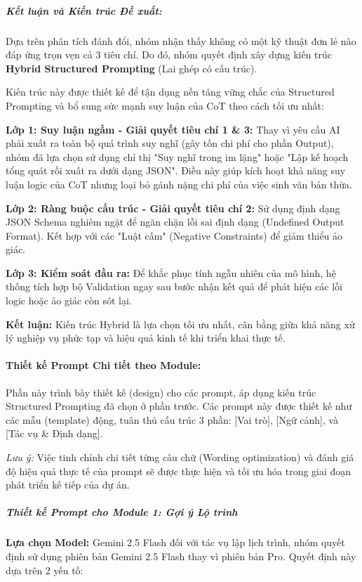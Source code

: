 \subparagraph{Kết luận và Kiến trúc Đề xuất:}

Dựa trên phân tích đánh đổi, nhóm nhận thấy không có một kỹ thuật đơn lẻ nào đáp ứng trọn vẹn cả 3 tiêu chí. Do đó, nhóm quyết định xây dựng kiến trúc \textbf{Hybrid Structured Prompting} (Lai ghép có cấu trúc).

Kiến trúc này được thiết kế để tận dụng nền tảng vững chắc của Structured Prompting và bổ sung sức mạnh suy luận của CoT theo cách tối ưu nhất:

\textbf{Lớp 1: Suy luận ngầm - Giải quyết tiêu chí 1 \& 3:} Thay vì yêu cầu AI phải xuất ra toàn bộ quá trình suy nghĩ (gây tốn chi phí cho phần Output), nhóm đã lựa chọn sử dụng chỉ thị "Suy nghĩ trong im lặng" hoặc "Lập kế hoạch tổng quát rồi xuất ra dưới dạng JSON". Điều này giúp kích hoạt khả năng suy luận logic của CoT nhưng loại bỏ gánh nặng chi phí của việc sinh văn bản thừa.

\textbf{Lớp 2: Ràng buộc cấu trúc - Giải quyết tiêu chí 2:} Sử dụng định dạng JSON Schema nghiêm ngặt để ngăn chặn lỗi sai định dạng (Undefined Output Format). Kết hợp với các "Luật cấm" (Negative Constraints) để giảm thiểu ảo giác.

\textbf{Lớp 3: Kiểm soát đầu ra:} Để khắc phục tính ngẫu nhiên của mô hình, hệ thống tích hợp bộ Validation ngay sau bước nhận kết quả để phát hiện các lỗi logic hoặc ảo giác còn sót lại.

\textbf{Kết luận:} Kiến trúc Hybrid là lựa chọn tối ưu nhất, cân bằng giữa khả năng xử lý nghiệp vụ phức tạp và hiệu quả kinh tế khi triển khai thực tế.

\paragraph{Thiết kế Prompt Chi tiết theo Module:}

Phần này trình bày thiết kế (design) cho các prompt, áp dụng kiến trúc Structured Prompting đã chọn ở phần trước. Các prompt này được thiết kế như các mẫu (template) động, tuân thủ cấu trúc 3 phần: [Vai trò], [Ngữ cảnh], và [Tác vụ \& Định dạng].

\textit{Lưu ý:} Việc tinh chỉnh chi tiết từng câu chữ (Wording optimization) và đánh giá độ hiệu quả thực tế của prompt sẽ được thực hiện và tối ưu hóa trong giai đoạn phát triển kế tiếp của dự án.

\subparagraph{Thiết kế Prompt cho Module 1: Gợi ý Lộ trình}

\textbf{Lựa chọn Model:} Gemini 2.5 Flash đối với tác vụ lập lịch trình, nhóm quyết định sử dụng phiên bản Gemini 2.5 Flash thay vì phiên bản Pro. Quyết định này dựa trên 2 yếu tố:

